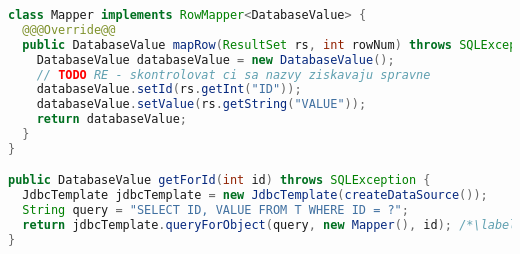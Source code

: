 

\begin{lstlisting}[language=Java, caption={Example of loading data from Oracle database using Spring JDBC Framework}, label={code:jdbcTemplate}]
class Mapper implements RowMapper<DatabaseValue> {
  @@@Override@@
  public DatabaseValue mapRow(ResultSet rs, int rowNum) throws SQLException {
    DatabaseValue databaseValue = new DatabaseValue();
    // TODO RE - skontrolovat ci sa nazvy ziskavaju spravne
    databaseValue.setId(rs.getInt("ID"));
    databaseValue.setValue(rs.getString("VALUE"));
    return databaseValue;
  }
}

public DatabaseValue getForId(int id) throws SQLException {
  JdbcTemplate jdbcTemplate = new JdbcTemplate(createDataSource());
  String query = "SELECT ID, VALUE FROM T WHERE ID = ?";
  return jdbcTemplate.queryForObject(query, new Mapper(), id); /*\label{code:jdbcTemplate:return}*/
}
\end{lstlisting}

